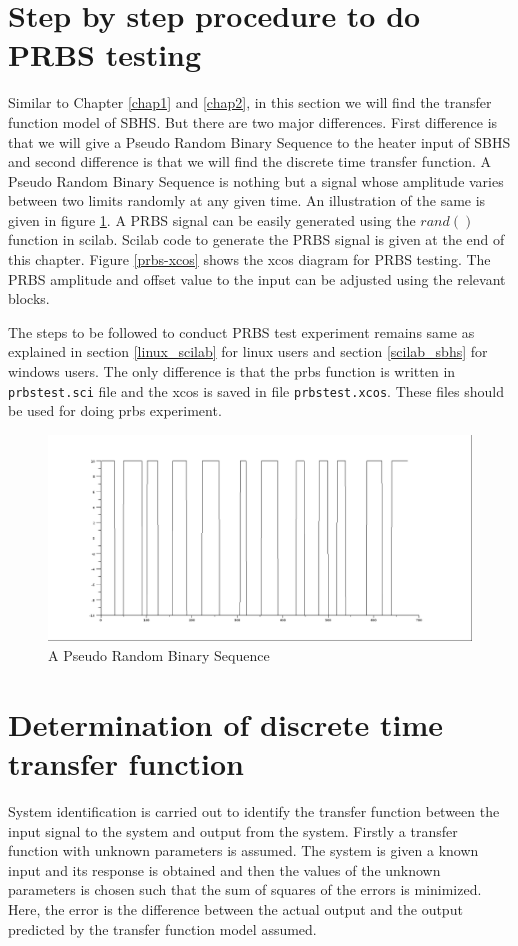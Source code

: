 \section{Step by step procedure to do PRBS testing}

Similar to Chapter \ref{chap1} and \ref{chap2}, in this section we will find the transfer function model of SBHS. But there are two major differences. First difference is that we will give a Pseudo Random Binary Sequence to the heater input of SBHS and second difference is that we will find the discrete time transfer function. A Pseudo Random Binary Sequence is nothing but a signal whose amplitude varies between two limits randomly at any given time. An illustration of the same is given in figure \ref{prbs-fig}. A PRBS signal can be easily generated using the $rand()$ function in scilab. Scilab code to generate the PRBS signal is given at the end of this chapter. Figure \ref{prbs-xcos} shows the xcos diagram for PRBS testing. The PRBS amplitude and offset value to the input can be adjusted using the relevant blocks. 

The steps to be followed to conduct PRBS test experiment remains same as explained in section \ref{linux_scilab} for linux users and section \ref{scilab_sbhs} for windows users. The only difference is that the prbs function is written in {\tt prbstest.sci} file and the xcos is saved in file {\tt prbstest.xcos}. These files should be used for doing prbs experiment. 
\begin{figure}
\centering
\includegraphics[width=0.7\linewidth]{prbs/prbs-illustration.png}
\caption{A Pseudo Random Binary Sequence}
\label{prbs-fig}
\end{figure}


\section{Determination of discrete time transfer function}

System identification is carried out to identify the transfer function between the input signal to the system and output from the system. Firstly a transfer function with unknown parameters is assumed. The system is given a known input and its response is obtained and then the values of the unknown parameters is chosen such that the sum of squares of the errors is minimized. Here, the error is the difference between the actual output and the output predicted by the transfer function model assumed.



